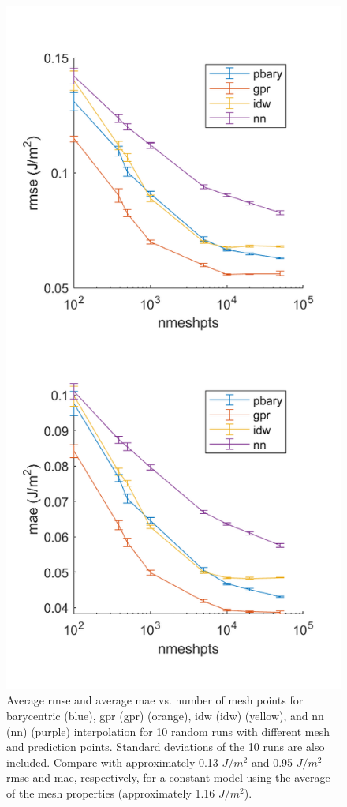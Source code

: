 \documentclass[preprint,12pt]{elsarticle}
\begin{document}
\begin{figure}
    \centering
    \includegraphics{brkerror.png}
    \caption{Average \acrlong{rmse} and average \acrlong{mae} vs. number of mesh points for barycentric (blue), \acrlong{gpr} (\acrshort{gpr}) (orange), \acrlong{idw} (\acrshort{idw}) (yellow), and \acrlong{nn} (\acrshort{nn}) (purple) interpolation for 10 random runs with different mesh and prediction points. Standard deviations of the 10 runs are also included. Compare with approximately 0.13 $J/m^2$ and 0.95 $J/m^2$ \acrshort{rmse} and \acrshort{mae}, respectively, for a constant model using the average of the mesh properties (approximately 1.16 $J/m^2$).}
    \label{fig:brkerror}
\end{figure}
\end{document}
